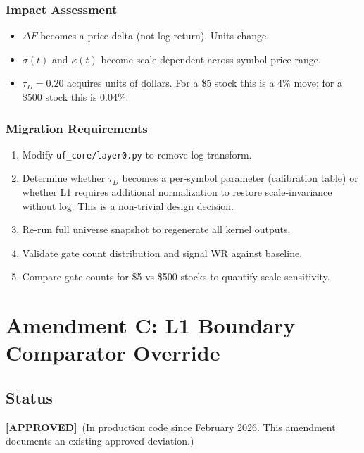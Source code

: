 \documentclass[11pt,a4paper]{article}
\newcommand{\approved}{\textcolor{green!60!black}{\textbf{[APPROVED]}}}
\begin{document}
\subsubsection*{Impact Assessment}
\begin{itemize}
    \item $\Delta F$ becomes a price delta (not log-return). Units change.
    \item $\sigma(t)$ and $\kappa(t)$ become scale-dependent across symbol price range.
    \item $\tau_D = 0.20$ acquires units of dollars. For a \$5 stock this is a 4\% move;
          for a \$500 stock this is 0.04\%.
\end{itemize}

\subsubsection*{Migration Requirements}
\begin{enumerate}
    \item Modify \texttt{uf\_core/layer0.py} to remove log transform.
    \item Determine whether $\tau_D$ becomes a per-symbol parameter (calibration
          table) or whether L1 requires additional normalization to restore
          scale-invariance without log. This is a non-trivial design decision.
    \item Re-run full universe snapshot to regenerate all kernel outputs.
    \item Validate gate count distribution and signal WR against baseline.
    \item Compare gate counts for \$5 vs \$500 stocks to quantify scale-sensitivity.
\end{enumerate}

\section{Amendment C: L1 Boundary Comparator Override}
\label{sec:amendment-c}

\subsection{Status}
\approved\ (In production code since February 2026. This amendment documents
an existing approved deviation.)
\end{document}
